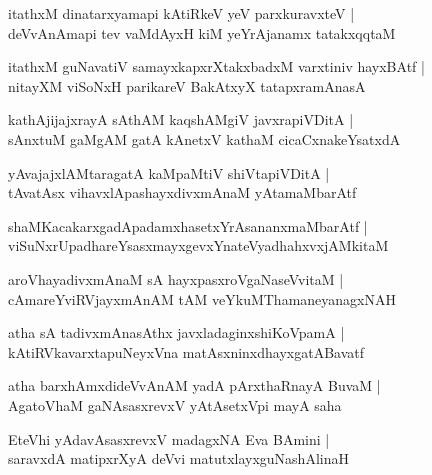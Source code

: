 \documentclass[twoside,12pt,openright]{book}
\newcounter{shloka}[chapter]
\begin{document}
\begin{shloka}%
itathxM dinatarxyamapi kAtiRkeV yeV parxkuravxteV |\\
deVvAnAmapi tev vaMdAyxH kiM yeYrAjanamx tatakxqqtaM
\end{shloka}

\begin{shloka}%
itathxM guNavatiV samayxkapxrXtakxbadxM varxtiniv hayxBAtf |\\
nitayXM viSoNxH parikareV BakAtxyX tatapxramAnasA
\end{shloka}

\begin{shloka}%
kathAjijajxrayA sAthAM kaqshAMgiV javxrapiVDitA |\\
sAnxtuM gaMgAM gatA kAnetxV kathaM cicaCxnakeYsatxdA
\end{shloka}

\begin{shloka}%
yAvajajxlAMtaragatA kaMpaMtiV shiVtapiVDitA |\\
tAvatAsx vihavxlApashayxdivxmAnaM yAtamaMbarAtf
\end{shloka}

\begin{shloka}%
shaMKacakarxgadApadamxhasetxYrAsananxmaMbarAtf |\\
viSuNxrUpadhareYsasxmayxgevxYnateVyadhahxvxjAMkitaM 
\end{shloka}

\begin{shloka}%
aroVhayadivxmAnaM sA hayxpasxroVgaNaseVvitaM |\\
cAmareYviRVjayxmAnAM tAM veYkuMThamaneyanagxNAH 
\end{shloka}

\begin{shloka}%
atha sA tadivxmAnasAthx javxladaginxshiKoVpamA |\\
kAtiRVkavarxtapuNeyxVna matAsxninxdhayxgatABavatf
\end{shloka}

\begin{shloka}%
atha barxhAmxdideVvAnAM yadA pArxthaRnayA BuvaM |\\
AgatoVhaM gaNAsasxrevxV yAtAsetxVpi mayA saha 
\end{shloka}

\begin{shloka}%
EteVhi yAdavAsasxrevxV madagxNA Eva BAmini |\\
saravxdA matipxrXyA deVvi matutxlayxguNashAlinaH
\end{shloka}
\end{document}
